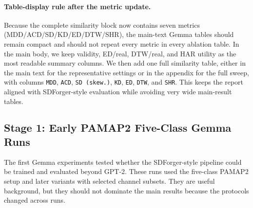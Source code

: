 \paragraph{Table-display rule after the metric update.}
Because the complete similarity block now contains seven metrics
(MDD/ACD/SD/KD/ED/DTW/SHR), the main-text Gemma tables should remain compact
and should not repeat every metric in every ablation table. In the main body, we
keep validity, ED/real, DTW/real, and HAR utility as the most readable summary
columns. We then add one full similarity table, either in the main text for the
representative settings or in the appendix for the full sweep, with columns
\texttt{MDD}, \texttt{ACD}, \texttt{SD (skew.)}, \texttt{KD}, \texttt{ED},
\texttt{DTW}, and \texttt{SHR}. This keeps the report aligned with
SDForger-style evaluation while avoiding very wide main-result tables.

\subsection*{Stage 1: Early PAMAP2 Five-Class Gemma Runs}

The first Gemma experiments tested whether the SDForger-style pipeline could be
trained and evaluated beyond GPT-2. These runs used the five-class PAMAP2 setup
and later variants with selected channel subsets. They are useful background,
but they should not dominate the main results because the protocols changed
across runs.

\begin{table}[t]
\centering
\small
\caption{Selected early PAMAP2 five-class Gemma results. These are supporting
evidence, not the main RQ2 result. ``Cond. acc.'' refers to the extended
condition-consistency classifier, not the TSTR utility classifier.}
\label{tab:shanjun-fiveclass}
\end{table}

